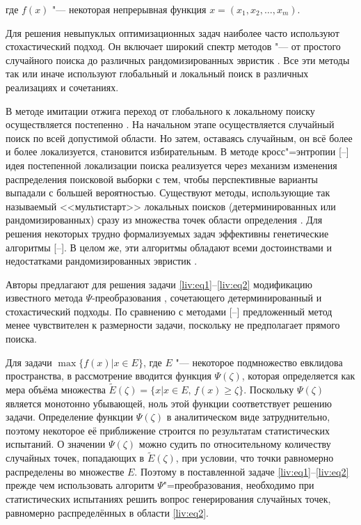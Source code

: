 где $f(x)$ "--- некоторая непрерывная функция $x=(x_1,x_2,\dots,x_m)$.



Для решения невыпуклых оптимизационных задач наиболее часто используют стохастический подход. Он включает широкий спектр методов "--- от простого случайного поиска до различных рандомизированных эвристик \cite{liv:bib:1, liv:bib:2}. Все эти методы так или иначе используют глобальный и локальный поиск в различных реализациях и сочетаниях. 



В методе имитации отжига переход от глобального к локальному поиску осуществляется постепенно \cite{liv:bib:3, liv:bib:4}. На начальном этапе осуществляется случайный поиск по всей допустимой области. Но затем, оставаясь случайным, он всё более и более локализуется, становится избирательным. В методе кросс"=энтропии [--] идея постепенной локализации поиска реализуется через механизм изменения распределения поисковой выборки с тем, чтобы перспективные варианты выпадали с большей вероятностью. Существуют методы, использующие так называемый <<мультистарт>> локальных поисков (детерминированных или рандомизированных) сразу из множества точек области определения \cite{liv:bib:8, liv:bib:9}. Для решения некоторых трудно формализуемых задач эффективны генетические алгоритмы [--]. В целом же, эти алгоритмы обладают всеми достоинствами и недостатками рандомизированных эвристик \cite{liv:bib:13}.



Авторы предлагают для решения задачи \eqref{liv:eq1}--\eqref{liv:eq2} модификацию известного метода $\Psi$-преобразования \cite{liv:bib:14, liv:bib:15}, сочетающего детерминированный и стохастический подходы. По сравнению с методами [--] предложенный метод менее чувствителен к размерности задачи, поскольку не предполагает прямого поиска. 



Для задачи $\max\{f(x)\vert x\in E\}$, где $E$ "--- некоторое подмножество евклидова пространства, в рассмотрение вводится функция $\Psi(\zeta)$, которая определяется как мера объёма множества $\tilde{E}(\zeta)=\{x\vert x\in E,\,f(x)\ge\zeta\}$. Поскольку $\Psi(\zeta)$ является монотонно убывающей, ноль этой функции соответствует решению задачи. Определение функции $\Psi(\zeta)$ в аналитическом виде затруднительно, поэтому некоторое её приближение строится по результатам статистических испытаний. О значении $\Psi(\zeta)$ можно судить по относительному количеству случайных точек, попадающих в $\tilde{E}(\zeta)$, при условии, что точки равномерно распределены во множестве $E$. Поэтому в поставленной задаче \eqref{liv:eq1}--\eqref{liv:eq2} прежде чем использовать алгоритм $\Psi$"=преобразования, необходимо при статистических испытаниях решить вопрос генерирования случайных точек, равномерно распределённых в области \eqref{liv:eq2}. 



